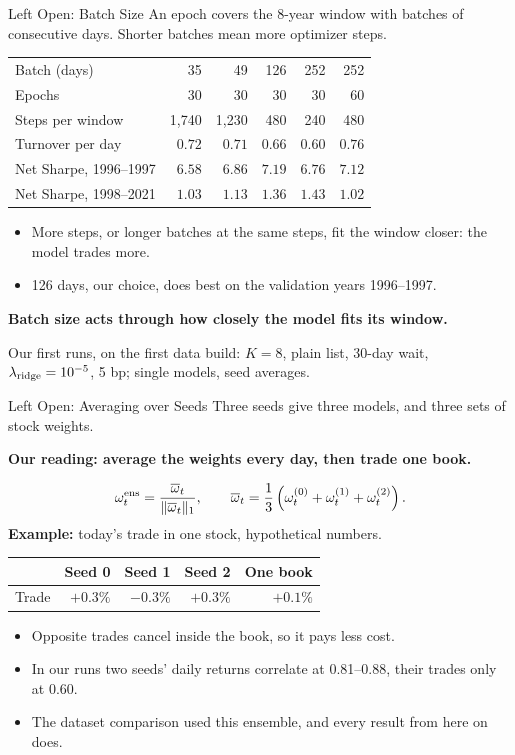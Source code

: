 \documentclass[11pt]{beamer}
\newcommand{\src}[1]{%
  \par\vfill
  {\fontsize{6.4}{7.6}\selectfont\color{Muted}#1\par}
}
\newcommand{\claim}[1]{%
  \par{\color{SBred}\bfseries #1\par}
}
\renewcommand{\src}[1]{%
  \par\vfill
  {\fontsize{6.4}{7.6}\selectfont#1\par}
}
\begin{document}
\begin{frame}{Left Open: Batch Size}
An epoch covers the 8-year window with batches of consecutive days.
Shorter batches mean more optimizer steps.
\begin{center}
\begin{tabular}{@{}lrrrrr@{}}
\toprule
Batch (days) & 35 & 49 & 126 & 252 & 252\\
Epochs & 30 & 30 & 30 & 30 & 60\\
Steps per window & 1{,}740 & 1{,}230 & 480 & 240 & 480\\
\midrule
Turnover per day & $0.72$ & $0.71$ & $0.66$ & $0.60$ & $0.76$\\
Net Sharpe, 1996--1997 & $6.58$ & $6.86$ & $7.19$ & $6.76$ & $7.12$\\
Net Sharpe, 1998--2021 & $1.03$ & $1.13$ & $1.36$ & $1.43$ & $1.02$\\
\bottomrule
\end{tabular}
\end{center}
\begin{itemize}
\item More steps, or longer batches at the same steps, fit the window closer: the model trades more.
\item 126 days, our choice, does best on the validation years 1996--1997.
\end{itemize}
\claim{Batch size acts through how closely the model fits its window.}
\src{Our first runs, on the first data build: $K=8$, plain list, 30-day wait, $\lambda_{\rm ridge}=10^{-5}$, 5 bp; single models, seed averages.}
\end{frame}

\begin{frame}{Left Open: Averaging over Seeds}
Three seeds give three models, and three sets of stock weights.
\claim{Our reading: average the weights every day, then trade one book.}
\[
\omega^{\rm ens}_{t}=\frac{\overline\omega_t}{\|\overline\omega_t\|_1},
\qquad
\overline\omega_t=\frac13\left(\omega^{(0)}_t+\omega^{(1)}_t+\omega^{(2)}_t\right).
\]
\textbf{Example:} today's trade in one stock, hypothetical numbers.
\begin{center}
\begin{tabular}{@{}lrrrr@{}}
\toprule
 & Seed 0 & Seed 1 & Seed 2 & One book\\
\midrule
Trade & $+0.3\%$ & $-0.3\%$ & $+0.3\%$ & $+0.1\%$\\
\bottomrule
\end{tabular}
\end{center}
\begin{itemize}
\item Opposite trades cancel inside the book, so it pays less cost.
\item In our runs two seeds' daily returns correlate at 0.81--0.88, their trades only at 0.60.
\item The dataset comparison used this ensemble, and every result from here on does.
\end{itemize}
\end{frame}
\end{document}
